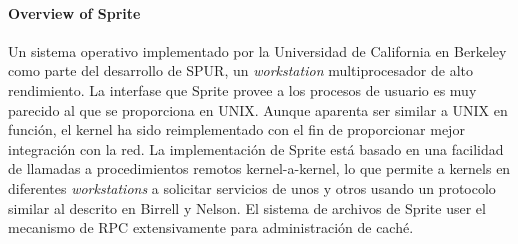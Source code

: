 \paragraph{\textnormal{\textbf{Overview of Sprite}}}
Un sistema operativo implementado por la Universidad de California en Berkeley como parte del desarrollo de SPUR, un \emph{workstation} multiprocesador de alto rendimiento. La interfase que Sprite provee a los procesos de usuario es muy parecido al que se proporciona en UNIX. Aunque aparenta ser similar a UNIX en función, el kernel ha sido reimplementado con el fin de proporcionar mejor integración con la red. La implementación de Sprite está basado en una facilidad de llamadas a procedimientos remotos kernel-a-kernel, lo que permite a kernels en diferentes \emph{workstations} a solicitar servicios de unos y otros usando un protocolo similar al descrito en Birrell y Nelson. El sistema de archivos de Sprite user el mecanismo de RPC extensivamente para administración de caché.

